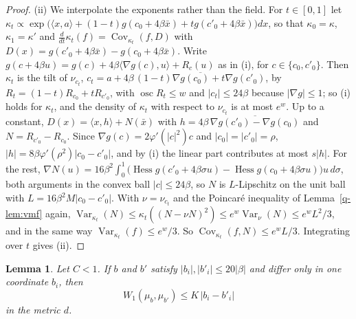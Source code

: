 \documentclass[aps,prd,twocolumn,superscriptaddress,nofootinbib,longbibliography,floatfix,amsmath,amssymb,10pt]{revtex4-2}
\newtheorem{lemma}[theorem]{Lemma}
\theoremstyle{definition}
\theoremstyle{remark}
\newcommand{\Hess}{\operatorname{Hess}}
\newcommand{\Cov}{\operatorname{Cov}}
\newcommand{\Var}{\operatorname{Var}}
\newcommand{\ip}[2]{\langle #1,#2\rangle}
\begin{document}
\begin{proof}
(ii) We interpolate the exponents rather than the field. For $t\in[0,1]$
let $\kappa_t\propto\exp\bigl(\ip xa+(1-t)g(c_0+4\beta\bar x)+tg(c'_0+4\beta
\bar x)\bigr)dx$, so that $\kappa_0=\kappa$, $\kappa_1=\kappa'$ and
$\frac d{dt}\kappa_t(f)=\Cov_{\kappa_t}(f,D)$ with $D(x)=g(c'_0+4\beta\bar x)-
g(c_0+4\beta\bar x)$. Write $g(c+4\beta u)=g(c)+4\beta\ip{\nabla g(c)}u+R_c(u)$
as in (i), for $c\in\{c_0,c'_0\}$. Then $\kappa_t$ is the tilt of $\nu_{c_t}$,
$c_t=a+4\beta\,\overline{(1-t)\nabla g(c_0)+t\nabla g(c'_0)}$, by
$R_t=(1-t)R_{c_0}+tR_{c'_0}$, with $\operatorname{osc}R_t\le w$ and $|c_t|\le
24\beta$ because $|\nabla g|\le1$; so (i) holds for $\kappa_t$, and the
density of $\kappa_t$ with respect to $\nu_{c_t}$ is at most $e^w$. Up to a
constant, $D(x)=\ip xh+N(\bar x)$ with $h=4\beta\,\overline{\nabla g(c'_0)-\nabla
g(c_0)}$ and $N=R_{c'_0}-R_{c_0}$. Since $\nabla g(c)=2\varphi'(|c|^2)c$ and
$|c_0|=|c'_0|=\rho$, $|h|=8\beta\varphi'(\rho^2)|c_0-c'_0|$, and by (i) the
linear part contributes at most $s|h|$. For the rest, $\nabla N(u)=16\beta^2
\int_0^1\bigl(\Hess g(c'_0+4\beta\sigma u)-\Hess g(c_0+4\beta\sigma u)\bigr)u\,
d\sigma$, both arguments in the convex ball $|c|\le24\beta$, so $N$ is
$L$-Lipschitz on the unit ball with $L=16\beta^2M|c_0-c'_0|$. With $\nu=
\nu_{c_t}$ and the Poincar\'e inequality of Lemma~\ref{q-lem:vmf} again,
$\Var_{\kappa_t}(N)\le\kappa_t((N-\nu N)^2)\le e^w\Var_\nu(N)\le e^wL^2/3$,
and in the same way $\Var_{\kappa_t}(f)\le e^w/3$. So
$\Cov_{\kappa_t}(f,N)\le e^wL/3$. Integrating over $t$ gives (ii).
\end{proof}

\begin{lemma}\label{lem:blockK}
Let $C<1$. If $b$ and $b'$ satisfy $|b_i|,|b'_i|\le20|\beta|$ and differ
only in one coordinate $b_i$, then
\[
W_1(\mu_b,\mu_{b'})\le K\,|b_i-b'_i|
\]
in the metric $d$.
\end{lemma}
\end{document}
